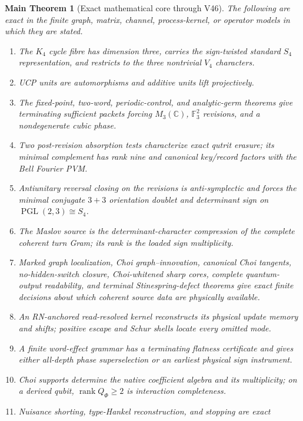 \documentclass[11pt,oneside,openany]{book}
\numberwithin{equation}{chapter}
\newtheorem{maintheorem}[theorem]{Main Theorem}
\theoremstyle{definition}
\theoremstyle{remark}
\newcommand{\C}{\mathbb C}
\newcommand{\rank}{\operatorname{rank}}
\newcommand{\Fthree}{\mathbb F_3}
\begin{document}
\begin{maintheorem}[Exact mathematical core through V46]
\label{thm:unconditional-core}
The following are exact in the finite graph, matrix, channel, process-kernel,
or operator models in which they are stated.
\begin{enumerate}[label=\textup{(U\arabic*)},leftmargin=2.8em]
\item The \(K_4\) cycle fibre has dimension three, carries the sign-twisted
      standard \(S_4\) representation, and restricts to the three nontrivial
      \(V_4\) characters.
\item UCP units are automorphisms and additive units lift projectively.
\item The fixed-point, two-word, periodic-control, and analytic-germ theorems
      give terminating sufficient packets forcing \(M_3(\C)\),
      \(\Fthree^2\) revisions, and a nondegenerate cubic phase.
\item Two post-revision absorption tests characterize exact qutrit erasure;
      its minimal complement has rank nine and canonical key/record factors
      with the Bell Fourier PVM.
\item Antiunitary reversal closing on the revisions is anti-symplectic and
      forces the minimal conjugate \(3+3\) orientation doublet and determinant
      sign on \(\operatorname{PGL}(2,3)\cong S_4\).
\item The Maslov source is the determinant-character compression of the
      complete coherent turn Gram; its rank is the loaded sign multiplicity.
\item Marked graph localization, Choi graph--innovation, canonical Choi
      tangents, no-hidden-switch closure, Choi-whitened sharp cores, complete
      quantum-output readability, and terminal Stinespring-defect theorems give
      exact finite decisions about which coherent source data are physically
      available.
\item An RN-anchored read-resolved kernel reconstructs its physical update
      memory and shifts; positive escape and Schur shells locate every omitted
      mode.
\item A finite word-effect grammar has a terminating flatness certificate and
      gives either all-depth phase superselection or an earliest physical sign
      instrument.
\item Choi supports determine the native coefficient algebra and its
      multiplicity; on a derived qubit, \(\rank Q_\Phi\ge2\) is interaction
      completeness.
\item Nuisance shorting, type-Hankel reconstruction, and stopping are exact

\end{enumerate}
\end{maintheorem}
\end{document}
